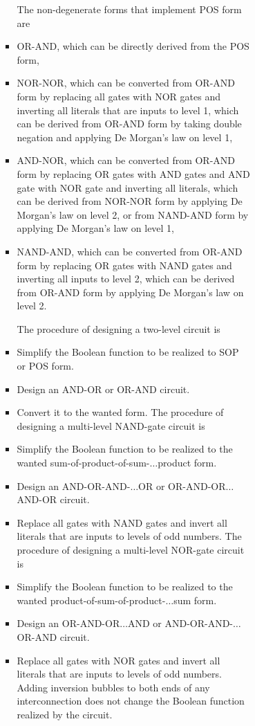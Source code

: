 \documentclass[a4paper,12pt]{article}
\begin{document}
\begin{itemize}
\begin{itemize}
\begin{itemize}
\begin{itemize}
\begin{itemize}
\begin{itemize}
\begin{itemize}
The non-degenerate forms that implement POS form are
\bit
\item OR-AND, which can be directly derived from the POS form,
\item NOR-NOR, which can be converted from OR-AND form by replacing all gates with NOR gates and inverting all literals that are inputs to level 1, which can be derived from OR-AND form by taking double negation and applying De Morgan's law on level 1,
\item AND-NOR, which can be converted from OR-AND form by replacing OR gates with AND gates and AND gate with NOR gate and inverting all literals, which can be derived from NOR-NOR form by applying De Morgan's law on level 2, or from NAND-AND form by applying De Morgan's law on level 1,
\item NAND-AND, which can be converted from OR-AND form by replacing OR gates with NAND gates and inverting all inputs to level 2, which can be derived from OR-AND form by applying De Morgan's law on level 2.
\eit

The procedure of designing a two-level circuit is
\ben
\item Simplify the Boolean function to be realized to SOP or POS form.
\item Design an AND-OR or OR-AND circuit.
\item Convert it to the wanted form.
\een
{}
The procedure of designing a multi-level NAND-gate circuit is
\ben
\item Simplify the Boolean function to be realized to the wanted sum-of-product-of-sum-$\ldots$product form.
\item Design an AND-OR-AND-$\ldots$OR or OR-AND-OR$\ldots$AND-OR circuit.
\item Replace all gates with NAND gates and invert all literals that are inputs to levels of odd numbers.
\een
The procedure of designing a multi-level NOR-gate circuit is
\ben
\item Simplify the Boolean function to be realized to the wanted product-of-sum-of-product-$\ldots$sum form.
\item Design an OR-AND-OR$\ldots$AND or AND-OR-AND-$\ldots$OR-AND circuit.
\item Replace all gates with NOR gates and invert all literals that are inputs to levels of odd numbers.
\een
{}
Adding inversion bubbles to both ends of any interconnection does not change the Boolean function realized by the circuit.


\end{itemize}
\end{itemize}
\end{itemize}
\end{itemize}
\end{itemize}
\end{itemize}
\end{itemize}
\end{document}
